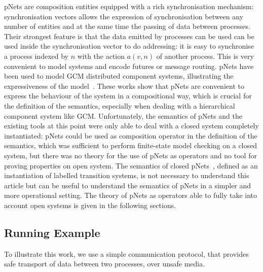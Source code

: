 \documentclass{lmcs}
\begin{document}
pNets are composition entities equipped with a rich synchronisation mechanism: synchronisation vectors allows the expression of synchronisation between any number of entities and at the same time the passing of data between processes. Their strongest feature is that the data emitted by processes can be used can be used inside the synchronisation vector to do addressing: it is easy to synchronise a process indexed by $n$ with the action $a(v,n)$ of another process. This is very convenient to model systems and encode futures or message routing. pNets have been used to model GCM distributed component systems, illustrating the expressiveness of the model~\cite{AmeurBoulifa2017}. These works show that pNets are convenient to express the behaviour of the system in a compositional way, which is crucial for the definition of the semantics, especially when dealing with a hierarchical component system like GCM. Unfortunately, the semantics of pNets and the existing tools at this point were only able to deal with a closed system completely instantiated: pNets could be used as composition operator in the definition of the semantics, which was sufficient to perform finite-state model checking on a closed system, but there was no theory for the use of pNets as operators and no tool for proving properties on open system. The semantics of closed pNets~\cite{AmeurBoulifa2017}, defined as an instantiation of labelled transition systems, is not necessary to understand this article but can be useful to  understand the semantics of pNets in a simpler and more operational setting. The theory of pNets as operators able to fully take into account open systems is given in the following sections.

\subsection{Running Example}
To illustrate this work, we use a simple communication protocol, that provides safe transport of data between two processes, over unsafe media. 
\end{document}
